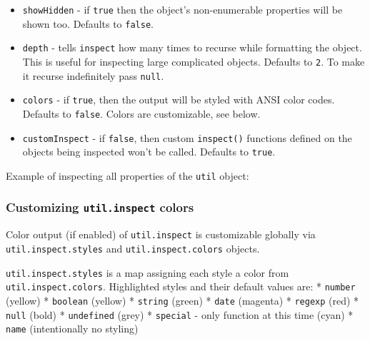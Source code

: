 \begin{itemize}
\item
  \texttt{showHidden} - if \texttt{true} then the object's
  non-enumerable properties will be shown too. Defaults to
  \texttt{false}.
\item
  \texttt{depth} - tells \texttt{inspect} how many times to recurse
  while formatting the object. This is useful for inspecting large
  complicated objects. Defaults to \texttt{2}. To make it recurse
  indefinitely pass \texttt{null}.
\item
  \texttt{colors} - if \texttt{true}, then the output will be styled
  with ANSI color codes. Defaults to \texttt{false}. Colors are
  customizable, see below.
\item
  \texttt{customInspect} - if \texttt{false}, then custom
  \texttt{inspect()} functions defined on the objects being inspected
  won't be called. Defaults to \texttt{true}.
\end{itemize}

Example of inspecting all properties of the \texttt{util} object:

\begin{Shaded}
\begin{Highlighting}[]
 \NormalTok{);}

\NormalTok{(}\NormalTok{: }\NormalTok{, }
\end{Highlighting}
\end{Shaded}

\subsubsection{Customizing \texttt{util.inspect} colors}

Color output (if enabled) of \texttt{util.inspect} is customizable
globally via \texttt{util.inspect.styles} and
\texttt{util.inspect.colors} objects.

\texttt{util.inspect.styles} is a map assigning each style a color from
\texttt{util.inspect.colors}. Highlighted styles and their default
values are: * \texttt{number} (yellow) * \texttt{boolean} (yellow) *
\texttt{string} (green) * \texttt{date} (magenta) * \texttt{regexp}
(red) * \texttt{null} (bold) * \texttt{undefined} (grey) *
\texttt{special} - only function at this time (cyan) * \texttt{name}
(intentionally no styling)

